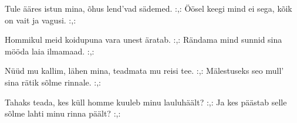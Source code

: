 Tule \"a\"ares istun mina,
\~ohus lend'vad s\"ademed.
:,: \"O\"osel keegi mind ei sega,
k\~oik on vait ja vagusi. :,:

Hommikul meid koidupuna
vara unest \"aratab.
:,: R\"andama mind sunnid sina
m\"o\"oda laia ilmamaad. :,:

N\"u\"ud mu kallim, l\"ahen mina,
teadmata mu reisi tee.
:,: M\"alestuseks seo mull' sina
r\"atik s\~olme rinnale. :,:

Tahaks teada, kes k\"ull homme
kuuleb minu lauluh\"a\"alt?
:,: Ja kes p\"a\"astab selle s\~olme
lahti minu rinna p\"a\"alt? :,: